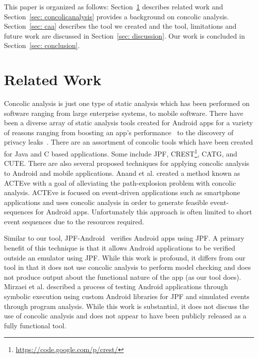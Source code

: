 \documentclass{sig-alternate-05-2015}
\begin{document}
This paper is organized as follows: Section~\ref{sec: relatedwork} describes related work and Section~\ref{sec: concolicanalysis} provides a background on concolic analysis. Section~\ref{sec: caa} describes the tool we created and the tool, limitations and future work are discussed in Section~\ref{sec: discussion}. Our work is concluded in Section~\ref{sec: conclusion}.


\section{Related Work}
\label{sec: relatedwork}

Concolic analysis is just one type of static analysis which has been performed on software ranging from large enterprise systems, to mobile software. There have been a diverse array of static analysis tools created for Android apps for a variety of reasons ranging from boosting an app's performance~\cite{Anwer:2014:CTB:2593902.2593918} to the discovery of privacy leaks~\cite{Matsumoto:2013:PPL:2448556.2448610}. There are an assortment of concolic tools which have been created for Java and C based applications. Some include JPF, CREST\footnote{\url{https://code.google.com/p/crest/}}, CATG, and CUTE\cite{Sen:2005:CCU:1081706.1081750}. There are also several proposed techniques for applying concolic analysis to Android and mobile applications. Anand et al.\cite{Anand:2012:ACT:2393596.2393666} created a method known as ACTEve with a goal of alleviating the path-explosion problem with concolic analysis. ACTEve is focused on event-driven applications such as smartphone applications and uses concolic analysis in order to generate feasible event-sequences for Android apps. Unfortunately this approach is often limited to short event sequences due to the resources required.

Similar to our tool, JPF-Android~\cite{vanderMerwe:2014:EPS:2557833.2560576} verifies Android apps using JPF. A primary benefit of this technique is that it allows Android applications to be verified outside an emulator using JPF. While this work is profound, it differs from our tool in that it does not use concolic analysis to perform model checking and does not produce output about the functional nature of the app (as our tool does). Mirzaei et al.\cite{Mirzaei:2012:TAA:2382756.2382798} described a process of testing Android applications through symbolic execution using custom Android libraries for JPF and simulated events through program analysis. While this work is substantial, it does not discuss the use of concolic analysis and does not appear to have been publicly released as a fully functional tool.
\end{document}

